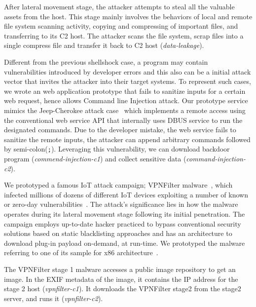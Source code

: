 After lateral movement stage, the attacker attempts to steal all the valuable assets from the host. 
This stage mainly involves the behaviors of local and remote file system scanning activity, copying and compressing of important files, and transferring to its C2 host.
The attacker scans the file system, scrap files into a single compress file and transfer it back to C2 host (\emph{data-leakage}).

Different from the previous shellshock case, a program may contain vulnerabilities introduced by developer errors and this also can be a initial attack vector that invites the attacker into their target systems. To represent
such cases, we wrote an web application prototype that fails to sanitize inputs for a certain web request, hence allows Command line Injection attack. 
Our prototype service mimics the Jeep-Cherokee attack case~\cite{miller:remote:2015} which implements a remote access using the conventional web service API that
internally uses DBUS service to run the designated commands. 
Due to the developer mistake, the web service fails to sanitize the remote inputs, the attacker can append arbitrary commands followed by semi-colon({\tt;}). 
Leveraging this vulnerability, we can download backdoor program (\emph{commend-injection-c1}) and collect sensitive data (\emph{command-injection-c2}).

We prototyped a famous IoT attack campaign; VPNFilter malware~\cite{vpnfilterschenier}, which infected millions of dozens of different IoT devices exploiting a number of
known or zero-day vulnerabilities~\cite{vpnfilter1,vpnfilter2}. The attack's
significance lies in how the malware operates during its lateral movement stage following its initial penetration. 
The campaign employs up-to-date hacker practiced to bypass conventional security solutions based on static blacklisting approaches and has an architecture to download plug-in payload on-demand, at run-time. 
We prototyped the malware referring to one of its sample for x86 architecture~\cite{vpnfilterx86}. 

The VPNFilter stage 1 malware accesses a public image repository to get an image. In the EXIF metadata of the image, it contains the IP address for the stage 2 host (\emph{vpnfilter-c1}). It downloads the VPNFilter stage2 from the stage2 server, and runs it (\emph{vpnfilter-c2}).


